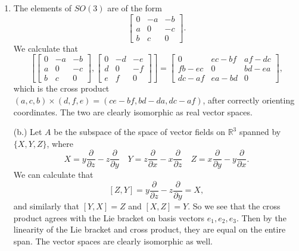 \documentclass[11pt, reqno]{article}
\theoremstyle{plain}
\theoremstyle{definition}
\theoremstyle{remark}
\newcommand{\RR}{\mathbb{R}}
\begin{document}
\begin{enumerate}
    \item[5.] The elements of $SO(3)$ are of the form
    \[
        \begin{bmatrix} 0 & -a & -b \\ a & 0 & -c \\ b & c & 0\end{bmatrix}.
    \]
    We calculate that
    \[  
        \left[\begin{bmatrix} 0 & -a & -b \\ a & 0 & -c \\ b & c & 0\end{bmatrix}, 
        \begin{bmatrix} 0 & -d & -e \\ d & 0 & -f \\ e & f & 0\end{bmatrix}\right] = 
        \begin{bmatrix} 0 & ec - bf & af -dc\\ fb-ec & 0 & bd - ea \\ dc - af & ea - bd & 0\end{bmatrix},
    \]
    which is the cross product $(a,c,b)\times(d,f,e) = (ce - bf, bd - da, dc - af)$, after correctly orienting coordinates. The two 
    are clearly isomorphic as real vector spaces. 

    (b.) Let $A$ be the subspace of the space of vector fields on $\RR^3$ spanned by $\{X,Y,Z\}$, where
    \[  
        X = y\frac{\partial}{\partial z} - z \frac{\partial}{\partial y}\quad Y = z \frac{\partial}{\partial x} - x \frac{\partial}{\partial z}
        \quad Z = x\frac{\partial}{\partial y} - y \frac{\partial}{\partial x}.
    \]
    We can calculate that
    \[
        [Z,Y] = y\frac{\partial}{\partial z} - z\frac{\partial}{\partial y} = X,
    \]
    and similarly that $[Y,X] = Z$ and $[X,Z] = Y$. So we see that the cross product agrees with the Lie bracket on basis vectors $e_1, e_2, e_3$.
    Then by the linearity of the Lie bracket and cross product, they are equal on the entire span. The vector spaces
    are clearly isomorphic as well. 

\end{enumerate}
\end{document}
